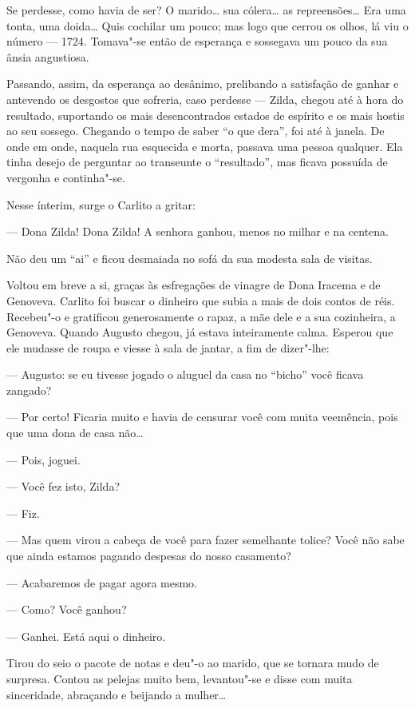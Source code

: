 Se perdesse, como havia de ser? O marido\ldots{} sua cólera\ldots{} as
repreensões\ldots{} Era uma tonta, uma doida\ldots{} Quis cochilar um
pouco; mas logo que cerrou os olhos, lá viu o número --- 1724. Tomava"-se
então de esperança e sossegava um pouco da sua ânsia angustiosa.

Passando, assim, da esperança ao desânimo, prelibando a satisfação de
ganhar e antevendo os desgostos que sofreria, caso perdesse --- Zilda,
chegou até à hora do resultado, suportando os mais desencontrados
estados de espírito e os mais hostis ao seu sossego. Chegando o tempo de
saber ``o que dera'', foi até à janela. De onde em onde, naquela rua
esquecida e morta, passava uma pessoa qualquer. Ela tinha desejo de
perguntar ao transeunte o ``resultado'', mas ficava possuída de vergonha
e continha"-se.

Nesse ínterim, surge o Carlito a gritar:

--- Dona Zilda! Dona Zilda! A senhora ganhou, menos no milhar e na
centena.

Não deu um ``ai'' e ficou desmaiada no sofá da sua modesta sala de
visitas.

Voltou em breve a si, graças às esfregações de vinagre de Dona Iracema e
de Genoveva. Carlito foi buscar o dinheiro que subia a mais de dois
contos de réis. Recebeu"-o e gratificou generosamente o rapaz, a mãe dele
e a sua cozinheira, a Genoveva. Quando Augusto chegou, já estava
inteiramente calma. Esperou que ele mudasse de roupa e viesse à sala de
jantar, a fim de dizer"-lhe:

--- Augusto: se eu tivesse jogado o aluguel da casa no ``bicho'' você
ficava zangado?

--- Por certo! Ficaria muito e havia de censurar você com muita
veemência, pois que uma dona de casa não\ldots{}

--- Pois, joguei.

--- Você fez isto, Zilda?

--- Fiz.

--- Mas quem virou a cabeça de você para fazer semelhante tolice? Você
não sabe que ainda estamos pagando despesas do nosso casamento?

--- Acabaremos de pagar agora mesmo.

--- Como? Você ganhou?

--- Ganhei. Está aqui o dinheiro.

Tirou do seio o pacote de notas e deu"-o ao marido, que se tornara mudo
de surpresa. Contou as pelejas muito bem, levantou"-se e disse com muita
sinceridade, abraçando e beijando a mulher\ldots{}


